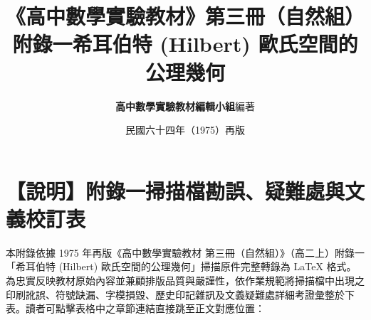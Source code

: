 \documentclass[a4paper,12pt,twoside]{article}
\title{\LARGE\textbf{《高中數學實驗教材》第三冊（自然組）}\\[0.5em] \Large\textbf{附錄一\quad 希耳伯特 (Hilbert) 歐氏空間的公理幾何}}
\author{\textbf{高中數學實驗教材編輯小組}\quad 編著}
\date{民國六十四年（1975）再版}
\begin{document}
\maketitle
\thispagestyle{firstpage}

\section*{【說明】附錄一掃描檔勘誤、疑難處與文義校訂表}
\label{sec:errata_notes_b3_a1}

本附錄依據 1975 年再版《高中數學實驗教材 第三冊（自然組）》（高二上）附錄一「希耳伯特 (Hilbert) 歐氏空間的公理幾何」掃描原件完整轉錄為 \LaTeX{} 格式。為忠實反映教材原始內容並兼顧排版品質與嚴謹性，依作業規範將掃描檔中出現之印刷訛誤、符號缺漏、字模損毀、歷史印記雜訊及文義疑難處詳細考證彙整於下表。讀者可點擊表格中之章節連結直接跳至正文對應位置：
\end{document}
